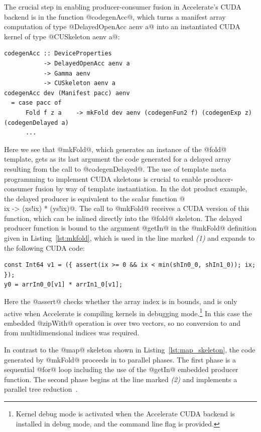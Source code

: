 The crucial step in enabling producer-consumer fusion in Accelerate's CUDA
backend is in the function @codegenAcc@, which turns a manifest array
computation of type @DelayedOpenAcc aenv a@ into an instantiated CUDA
kernel of type @CUSkeleton aenv a@:
%
\begin{lstlisting}[style=haskell]
codegenAcc :: DeviceProperties
           -> DelayedOpenAcc aenv a
           -> Gamma aenv
           -> CUSkeleton aenv a
codegenAcc dev (Manifest pacc) aenv
  = case pacc of
      Fold f z a    -> mkFold dev aenv (codegenFun2 f) (codegenExp z) (codegenDelayed a)
      ...
\end{lstlisting}
%
Here we see that @mkFold@, which generates an instance of the @fold@
template, gets as its last argument the code generated for a delayed array
resulting from the call to @codegenDelayed@. The use of template meta
programming to implement CUDA skeletons is crucial to enable producer-consumer
fusion by way of template instantiation. In the dot product example, the delayed
producer is equivalent to the scalar function @\\ix -> (xs!ix) * (ys!ix)@.
The call to @mkFold@ receives a CUDA version of this function, which can be
inlined directly into the @fold@ skeleton. The delayed producer function is
bound to the argument @getIn@ in the @mkFold@ definition given in
Listing~\ref{lst:mkfold}, which is used in the line marked \emph{(1)} and
expands to the following CUDA code:
%
\begin{lstlisting}[style=haskell]
const Int64 v1 = ({ assert(ix >= 0 && ix < min(shIn0_0, shIn1_0)); ix; });
y0 = arrIn0_0[v1] * arrIn1_0[v1];
\end{lstlisting}
%
Here the @assert@ checks whether the array index is in bounds, and is only
active when Accelerate is compiling kernels in debugging mode.\footnote{Kernel
debug mode is activated when the Accelerate CUDA backend is installed in debug
mode, and the command line flag  is provided.} In this case the
embedded @zipWith@ operation is over two vectors, so no conversion to and
from multidimensional indices was required.

In contrast to the @map@ skeleton shown in Listing~\ref{lst:map_skeleton},
the code generated by @mkFold@ proceeds in to parallel phases. The first
phase is a sequential @for@ loop including the use of the @getIn@
embedded producer function. The second phase begins at the line marked
\emph{(2)} and implements a parallel tree reduction~\cite{Chatterjee:2009vh}.

